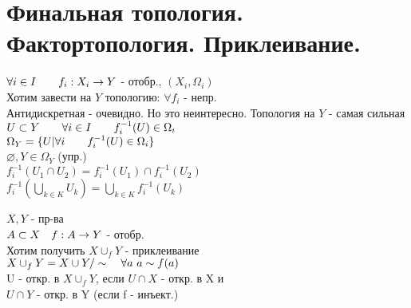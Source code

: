 \documentclass[geometry.tex]{subfiles}
\begin{document}
  \section{Финальная топология. Фактортопология. Приклеивание.}

    \begin{example}
    $\forall i \in I \qquad f_i: X_i \rightarrow Y$ - отобр., $(X_i, \Omega_i)$\\
    Хотим завести на $Y$ топологию: $\forall f_i$ - непр.\\
    Антидискретная - очевидно. Но это неинтересно. Топология на $Y$ - самая сильная\\
    $U \subset Y \qquad \forall i \in I \qquad f_i^{-1}(U) \in \Omega_i$\\
    $\Omega_Y = \{U| \forall i \qquad f_i^{-1}(U) \in \Omega_i\}$\\
    $\varnothing, Y \in \Omega_Y$ (упр.)\\
    $f_i^{-1}(U_1 \cap U_2) = f^{-1}_i (U_1) \cap f_i^{-1}(U_2)$\\
    $f_i^{-1}(\bigcup_{k \in K} U_k) = \bigcup_{k \in K} f_i^{-1}(U_k)$
  \end{example}

  \begin{example}[приклеивание]
      $X, Y$ - пр-ва\\
      $A \subset X \quad f: A \rightarrow Y$ - отобр.\\
      Хотим получить $X \cup_f Y$ - приклеивание\\
      $X \cup_f Y = X \cup Y /\sim \quad \forall a \ a \sim f(a)$\\
      U - откр. в $X \cup_f Y$, если $U \cap X$ - откр. в X и\\ $U \cap Y$ - откр. в Y
      (если f - инъект.)
  \end{example}
\end{document}
